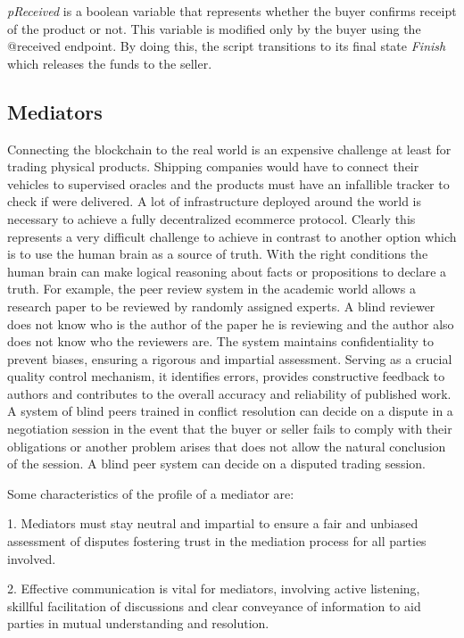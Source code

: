 \documentclass[12pt]{article}
\begin{document}
\emph{pReceived} is a boolean variable that represents whether the buyer confirms receipt of the product or not. This variable is modified only by the buyer using the @received endpoint.
By doing this, the script transitions to its final state \emph{Finish} which releases the funds to the seller.
 
\subsection { Mediators }  

Connecting the blockchain to the real world is an expensive challenge at least for trading physical products.
Shipping companies would have to connect their vehicles to supervised oracles and the products must have an infallible tracker to check if were delivered.
A lot of infrastructure deployed around the world is necessary to achieve a fully decentralized ecommerce protocol.
Clearly this represents a very difficult challenge to achieve in contrast to another option which is to use the human brain as a source of truth.
With the right conditions the human brain can make logical reasoning about facts or propositions to declare a truth.
For example, the peer review system in the academic world allows a research paper to be reviewed by randomly assigned experts.
A blind reviewer does not know who is the author of the paper he is reviewing and the author also does not know who the reviewers are.
The system maintains confidentiality to prevent biases, ensuring a rigorous and impartial assessment. Serving as a crucial quality control mechanism, it identifies errors, provides constructive feedback to authors and contributes to the overall accuracy and reliability of published work. 
A system of blind peers trained in conflict resolution can decide on a dispute in a negotiation session in the event that the buyer or seller fails to comply with their obligations or another problem arises that does not allow the natural conclusion of the session.
A blind peer system can decide on a disputed trading session.

Some characteristics of the profile of a mediator are:

1. Mediators must stay neutral and impartial to ensure a fair and unbiased assessment of disputes fostering trust in the mediation process for all parties involved.

2. Effective communication is vital for mediators, involving active listening, skillful facilitation of discussions and clear conveyance of information to aid parties in mutual understanding and resolution.
\end{document}
